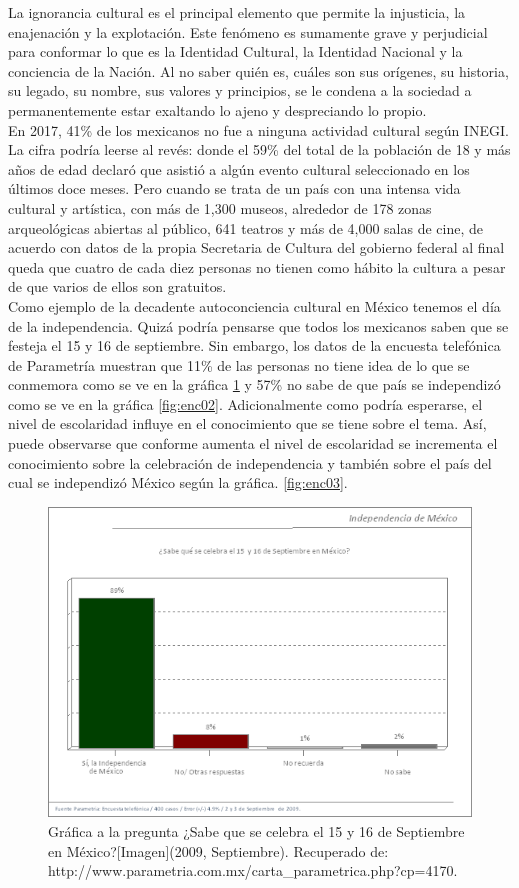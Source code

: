 La ignorancia cultural es el principal elemento que permite la injusticia, la enajenación y la explotación. Este fenómeno es sumamente grave y perjudicial para conformar lo que es la Identidad Cultural, la Identidad Nacional y la conciencia de la Nación. Al no saber quién es, cuáles son sus orígenes, su historia, su legado, su nombre, sus valores y principios, se le condena a la sociedad a permanentemente estar exaltando lo ajeno y despreciando lo propio.
\\[1pt]

En 2017, 41\% de los mexicanos no fue a ninguna actividad cultural según INEGI\cite{pp02}. La cifra podría leerse al revés: donde el 59\% del total de la población de 18 y más años de edad declaró que asistió a algún evento cultural seleccionado en los últimos doce meses. Pero cuando se trata de un país con una intensa vida cultural y artística, con más de 1,300 museos, alrededor de 178 zonas arqueológicas abiertas al público, 641 teatros y más de 4,000 salas de cine, de acuerdo con datos de la propia Secretaria de Cultura del gobierno federal\cite{pp01} al final queda que cuatro de cada diez personas no tienen como hábito la cultura a pesar de que varios de ellos son gratuitos.
\\[1pt]

Como ejemplo de la decadente autoconciencia cultural en México tenemos el día de la independencia. Quizá podría pensarse que todos los mexicanos saben que se festeja el 15 y 16 de septiembre. Sin embargo, los datos de la encuesta telefónica de Parametría\cite{pp03} muestran que 11\% de las personas no tiene idea de lo que se conmemora como se ve en la gráfica \ref{fig:enc01} y 57\% no sabe de que país se independizó como se ve en la gráfica \ref{fig:enc02}. Adicionalmente como podría esperarse, el nivel de escolaridad influye en el conocimiento que se tiene sobre el tema. Así, puede observarse que conforme aumenta el nivel de escolaridad se incrementa el conocimiento sobre la celebración de independencia y también sobre el país del cual se independizó México según la gráfica. \ref{fig:enc03}.
\\[1pt]

\begin{figure}
	\centering 
	\includegraphics[width=.50\textwidth]{03MarcoTeorico/imageR/enc01}
	\caption{Gráfica a la pregunta ¿Sabe que se celebra el 15 y 16 de Septiembre en México?[Imagen](2009, Septiembre). Recuperado de: http://www.parametria.com.mx/carta\_parametrica.php?cp=4170.}
	\label{fig:enc01}
\end{figure}

